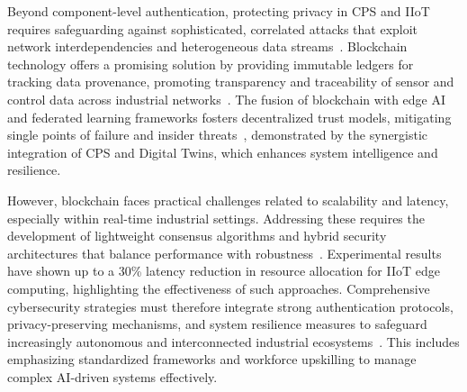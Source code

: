 \documentclass[sigconf]{acmart}
\begin{document}
Beyond component-level authentication, protecting privacy in CPS and IIoT requires safeguarding against sophisticated, correlated attacks that exploit network interdependencies and heterogeneous data streams~\cite{ref15}. Blockchain technology offers a promising solution by providing immutable ledgers for tracking data provenance, promoting transparency and traceability of sensor and control data across industrial networks~\cite{ref20}. The fusion of blockchain with edge AI and federated learning frameworks fosters decentralized trust models, mitigating single points of failure and insider threats~\cite{ref22}, demonstrated by the synergistic integration of CPS and Digital Twins, which enhances system intelligence and resilience.

However, blockchain faces practical challenges related to scalability and latency, especially within real-time industrial settings. Addressing these requires the development of lightweight consensus algorithms and hybrid security architectures that balance performance with robustness~\cite{ref31}. Experimental results have shown up to a 30\% latency reduction in resource allocation for IIoT edge computing, highlighting the effectiveness of such approaches. Comprehensive cybersecurity strategies must therefore integrate strong authentication protocols, privacy-preserving mechanisms, and system resilience measures to safeguard increasingly autonomous and interconnected industrial ecosystems~\cite{ref32}. This includes emphasizing standardized frameworks and workforce upskilling to manage complex AI-driven systems effectively.
\end{document}
